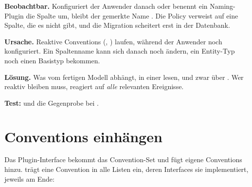 \begin{failure}
  \textbf{Beobachtbar.} Konfiguriert der Anwender danach
   oder
  benennt ein Naming-Plugin die Spalte um, bleibt der gemerkte Name
  . Die Policy verweist auf eine Spalte, die es nicht gibt, und
  die Migration scheitert erst in der Datenbank.

  \textbf{Ursache.} Reaktive Conventions (, ) laufen, während
  der Anwender noch konfiguriert. Ein Spaltenname kann sich danach noch ändern, ein
  Entity-Typ noch einen Basistyp bekommen.

  \textbf{Lösung.} Was vom fertigen Modell abhängt, in einer
   lesen, und zwar über
  . Wer reaktiv bleiben
  muss, reagiert auf \emph{alle} relevanten Ereignisse.

  \textbf{Test:}
  und die Gegenprobe bei .
\end{failure}

\section{Conventions einhängen}

Das Plugin-Interface  bekommt das
Convention-Set und fügt eigene Conventions hinzu.
 trägt eine Convention in alle Listen ein,
deren Interfaces sie implementiert, jeweils am Ende:

